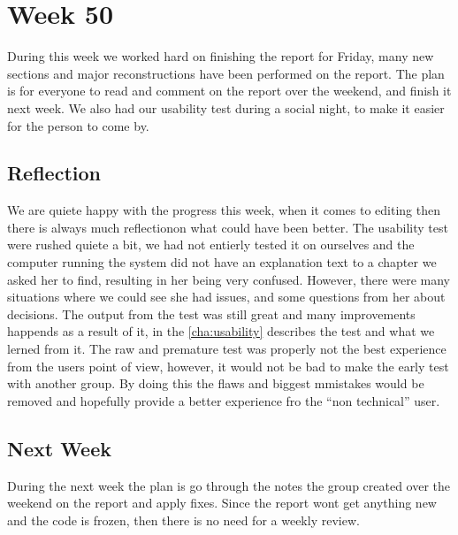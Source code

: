\section*{Week 50}
During this week we worked hard on finishing the report for Friday, many new
sections and major reconstructions have been performed on the report. The plan
is for everyone to read and comment on the report over the weekend, and finish
it next week. We also had our usability test during a social night, to make it
easier for the person to come by.

\subsection*{Reflection}
We are quiete happy with the progress this week, when it comes to editing then
there is always much reflectionon what could have been better. The usability
test were rushed quiete a bit, we had not entierly tested it on ourselves and
the computer running the system did not have an explanation text to a chapter we
asked her to find, resulting in her being very confused. However, there were
many situations where we could see she had issues, and some questions from her
about decisions. The output from the test was still great and many improvements
happends as a result of it, in the \autoref{cha:usability} describes the test
and what we lerned from it. The raw and premature test was properly not the best
experience from the users point of view, however, it would not be bad to make
the early test with another group. By doing this the flaws and biggest mmistakes
would be removed and hopefully provide a better experience fro the ``non
technical'' user.

\subsection*{Next Week}
During the next week the plan is go through the notes the group created over the
weekend on the report and apply fixes. Since the report wont get anything new
and the code is frozen, then there is no need for a weekly review.
